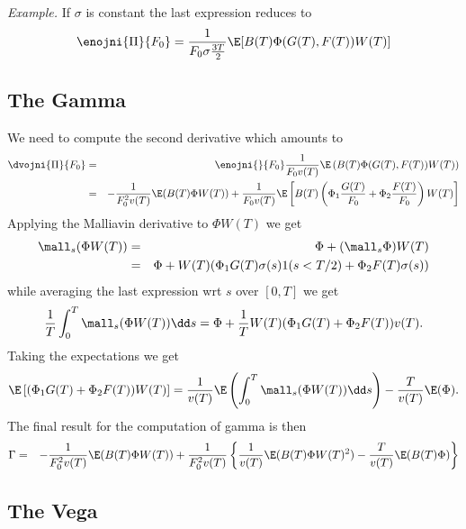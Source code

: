 {\it Example.} If $\sigma$ is constant the last expression reduces to 
\begin {eqnarray*}
  \enojni {\Pi} {F_0} = \frac {1} {F_0 \sigma \frac {3 T} {2} } \E [ B(T) \Phi (G(T), F(T)) W(T) ]
\end {eqnarray*}



\subsection {The Gamma}
\label {path_dep_gamma}

We need to compute the second derivative which amounts to 
\begin {eqnarray*}
  \dvojni {\Pi} {F_0} & = & \enojni { } {F_0} 
  \frac 1 {F_0 v(T)} \E \left( B(T) \Phi (G(T), F(T)) W(T) \right) 
  \\
  & = & - \frac 1 {F_0^2 v(T) } \E ( B(T) \Phi W(T) ) + 
  \frac 1 {F_0 v(T) } \E \left[ 
    B(T) \left( \Phi_1 \frac {G(T)} {F_0} + \Phi_2 \frac {F(T) } {F_0} \right) W(T) 
  \right]
\end {eqnarray*}
Applying the Malliavin derivative to $\Phi W(T)$ we get 
\begin {eqnarray*}
  \mall_s ( \Phi W(T) ) & = & \Phi + ( \mall_s \Phi ) W(T) 
  \\
  & = & \Phi + W(T) ( \Phi_1 G(T) \sigma (s) 1 ( s < T/2) + \Phi_2 F(T) \sigma(s) ) 
\end {eqnarray*}
while averaging the last expression wrt $s$ over $[0,T]$ we get 
\begin {eqnarray*}
  \frac 1 T \int_0^T \mall_s (\Phi W(T) ) \dd s = \Phi + \frac 1 T W(T) 
  ( \Phi_1 G(T) + \Phi_2 F(T) ) v(T) .
\end {eqnarray*}
Taking the expectations we get 
\begin {eqnarray*}
  \E \left[ ( \Phi_1 G(T) + \Phi_2 F(T) ) W(T) \right] = 
  \frac 1 {v(T)} \E \left( \int_0^T \mall_s ( \Phi W(T) ) \dd s \right) - \frac T {v(T)} \E (\Phi ).
\end {eqnarray*}
The final result for the computation of gamma is then 
\begin {eqnarray*}
  \Gamma & = & - \frac {1} {F_0^2 v(T)} \E ( B(T) \Phi W(T) ) + 
  \frac 1 {F_0^2 v(T)} \left\{ 
  \frac 1 {v(T)} \E (B(T) \Phi W(T)^2 ) - \frac {T} {v(T)} \E ( B(T) \Phi ) 
  \right\}
\end {eqnarray*}


\subsection {The Vega}
\label {path_dep_vega}

